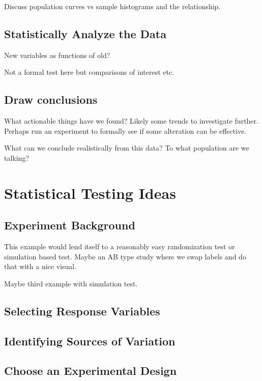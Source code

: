 \documentclass[]{book}
\theoremstyle{definition}
\theoremstyle{definition}
\theoremstyle{definition}
\theoremstyle{remark}
\begin{document}
Discuss population curves vs sample histograms and the relationship.

\subsection{Statistically Analyze the
Data}\label{statistically-analyze-the-data}

New variables as functions of old?

Not a formal test here but comparisons of interest etc.

\subsection{Draw conclusions}\label{draw-conclusions}

What actionable things have we found? Likely some trends to investigate
further. Perhaps run an experiment to formally see if some alteration
can be effective.

What can we conclude realistically from this data? To what population
are we talking?

\section{Statistical Testing Ideas}\label{statistical-testing-ideas}

\subsection{Experiment Background}\label{experiment-background-1}

This example would lend itself to a reasonably easy randomization test
or simulation based test. Maybe an AB type study where we swap labels
and do that with a nice visual.

Maybe third example with simulation test.

\subsection{Selecting Response
Variables}\label{selecting-response-variables-1}

\subsection{Identifying Sources of
Variation}\label{identifying-sources-of-variation-1}

\subsection{Choose an Experimental
Design}\label{choose-an-experimental-design-1}
\end{document}
